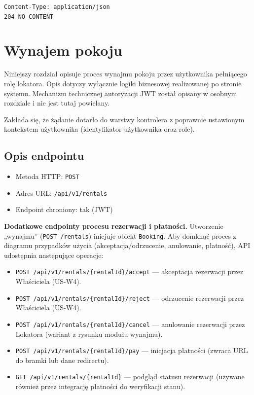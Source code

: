 \documentclass[11pt, a4paper]{article}
\begin{document}
\begin{lstlisting}[style=http,caption={Odpowiedź HTTP — sukces}]
Content-Type: application/json
204 NO CONTENT
\end{lstlisting}

\section{Wynajem pokoju}

Niniejszy rozdział opisuje proces wynajmu pokoju przez użytkownika pełniącego
rolę lokatora. Opis dotyczy wyłącznie logiki biznesowej realizowanej po stronie
systemu. Mechanizm technicznej autoryzacji JWT został opisany w osobnym rozdziale
i nie jest tutaj powielany.

Zakłada się, że żądanie dotarło do warstwy kontrolera z poprawnie ustawionym
kontekstem użytkownika (identyfikator użytkownika oraz role).

\subsection{Opis endpointu}

\begin{itemize}
    \item Metoda HTTP: \texttt{POST}
    \item Adres URL: \texttt{/api/v1/rentals}
    \item Endpoint chroniony: tak (JWT)
\end{itemize}

\noindent\textbf{Dodatkowe endpointy procesu rezerwacji i płatności.} Utworzenie „wynajmu” (\texttt{POST /rentals}) inicjuje obiekt \texttt{Booking}.
Aby domknąć proces z diagramu przypadków użycia (akceptacja/odrzucenie, anulowanie, płatność), API udostępnia następujące operacje:
\begin{itemize}
    \item \texttt{POST /api/v1/rentals/\{rentalId\}/accept} --- akceptacja rezerwacji przez Właściciela (US-W4).
    \item \texttt{POST /api/v1/rentals/\{rentalId\}/reject} --- odrzucenie rezerwacji przez Właściciela (US-W4).
    \item \texttt{POST /api/v1/rentals/\{rentalId\}/cancel} --- anulowanie rezerwacji przez Lokatora (wariant z rysunku modułu wynajmu).
    \item \texttt{POST /api/v1/rentals/\{rentalId\}/pay} --- inicjacja płatności (zwraca URL do bramki lub dane redirectu).
    \item \texttt{GET /api/v1/rentals/\{rentalId\}} --- podgląd statusu rezerwacji (używane również przez integrację płatności do weryfikacji stanu).
\end{itemize}
\end{document}
